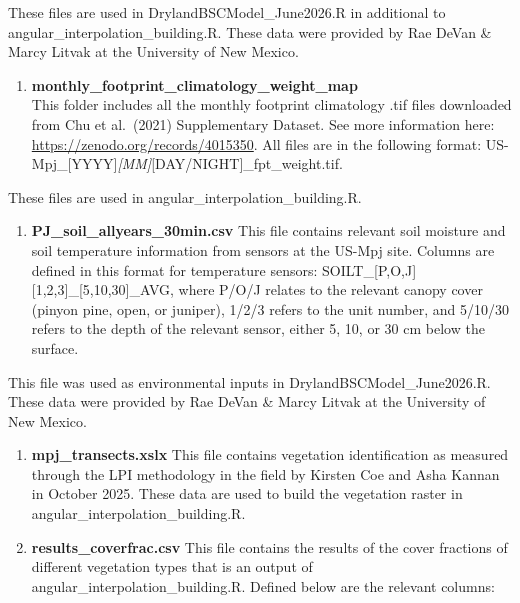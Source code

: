 \documentclass[
]{article}
\providecommand{\tightlist}{%
  \setlength{\itemsep}{0pt}\setlength{\parskip}{0pt}}
\begin{document}
These files are used in DrylandBSCModel\_June2026.R in additional to
angular\_interpolation\_building.R. These data were provided by Rae
DeVan \& Marcy Litvak at the University of New Mexico.\\

\begin{enumerate}
\def\labelenumi{\arabic{enumi}.}
\setcounter{enumi}{2}
\tightlist
\item
  \textbf{monthly\_footprint\_climatology\_weight\_map}\\
  This folder includes all the monthly footprint climatology .tif files
  downloaded from Chu et al.~(2021) Supplementary Dataset. See more
  information here: \url{https://zenodo.org/records/4015350}. All files
  are in the following format:
  US-Mpj\_{[}YYYY{]}\emph{{[}MM{]}}{[}DAY/NIGHT{]}\_fpt\_weight.tif.\\
\end{enumerate}

These files are used in angular\_interpolation\_building.R.\\

\begin{enumerate}
\def\labelenumi{\arabic{enumi}.}
\setcounter{enumi}{3}
\tightlist
\item
  \textbf{PJ\_soil\_allyears\_30min.csv} This file contains relevant
  soil moisture and soil temperature information from sensors at the
  US-Mpj site. Columns are defined in this format for temperature
  sensors: SOILT\_{[}P,O,J{]}{[}1,2,3{]}\_{[}5,10,30{]}\_AVG, where
  P/O/J relates to the relevant canopy cover (pinyon pine, open, or
  juniper), 1/2/3 refers to the unit number, and 5/10/30 refers to the
  depth of the relevant sensor, either 5, 10, or 30 cm below the
  surface.
\end{enumerate}

This file was used as environmental inputs in
DrylandBSCModel\_June2026.R. These data were provided by Rae DeVan \&
Marcy Litvak at the University of New Mexico.

\begin{enumerate}
\def\labelenumi{\arabic{enumi}.}
\setcounter{enumi}{4}
\item
  \textbf{mpj\_transects.xslx} This file contains vegetation
  identification as measured through the LPI methodology in the field by
  Kirsten Coe and Asha Kannan in October 2025. These data are used to
  build the vegetation raster in angular\_interpolation\_building.R.
\item
  \textbf{results\_coverfrac.csv} This file contains the results of the
  cover fractions of different vegetation types that is an output of
  angular\_interpolation\_building.R. Defined below are the relevant
  columns:
\end{enumerate}
\end{document}
